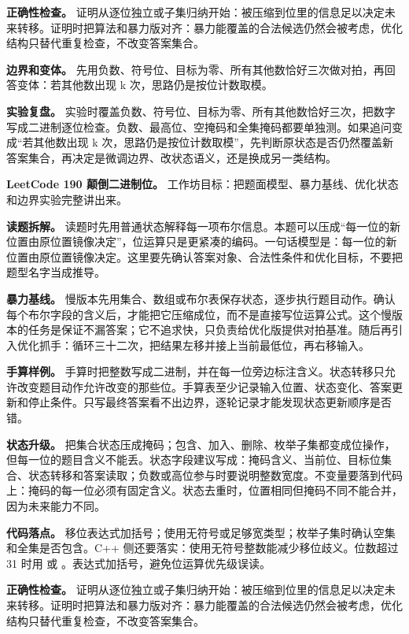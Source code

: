 \textbf{正确性检查。} 证明从逐位独立或子集归纳开始：被压缩到位里的信息足以决定未来转移。证明时把算法和暴力版对齐：暴力能覆盖的合法候选仍然会被考虑，优化结构只替代重复检查，不改变答案集合。

\textbf{边界和变体。} 先用负数、符号位、目标为零、所有其他数恰好三次做对拍，再回答变体：若其他数出现 k 次，思路仍是按位计数取模。

\textbf{实验复盘。} 实验时覆盖负数、符号位、目标为零、所有其他数恰好三次，把数字写成二进制逐位检查。负数、最高位、空掩码和全集掩码都要单独测。如果追问变成“若其他数出现 k 次，思路仍是按位计数取模”，先判断原状态是否仍然覆盖新答案集合，再决定是微调边界、改状态语义，还是换成另一类结构。

\noindent\textbf{LeetCode 190 颠倒二进制位。} 工作坊目标：把题面模型、暴力基线、优化状态和边界实验完整讲出来。

\textbf{读题拆解。} 读题时先用普通状态解释每一项布尔信息。本题可以压成“每一位的新位置由原位置镜像决定”，位运算只是更紧凑的编码。一句话模型是：每一位的新位置由原位置镜像决定。这里要先确认答案对象、合法性条件和优化目标，不要把题型名字当成推导。

\textbf{暴力基线。} 慢版本先用集合、数组或布尔表保存状态，逐步执行题目动作。确认每个布尔字段的含义后，才能把它压缩成位，而不是直接写位运算公式。这个慢版本的任务是保证不漏答案；它不追求快，只负责给优化版提供对拍基准。随后再引入优化抓手：循环三十二次，把结果左移并接上当前最低位，再右移输入。

\textbf{手算样例。} 手算时把整数写成二进制，并在每一位旁边标注含义。状态转移只允许改变题目动作允许改变的那些位。手算表至少记录输入位置、状态变化、答案更新和停止条件。只写最终答案看不出边界，逐轮记录才能发现状态更新顺序是否错。

\textbf{状态升级。} 把集合状态压成掩码；包含、加入、删除、枚举子集都变成位操作，但每一位的题目含义不能丢。状态字段建议写成：掩码含义、当前位、目标位集合、状态转移和答案读取；负数或高位参与时要说明整数宽度。不变量要落到代码上：掩码的每一位必须有固定含义。状态去重时，位置相同但掩码不同不能合并，因为未来能力不同。

\textbf{代码落点。} 移位表达式加括号；使用无符号或足够宽类型；枚举子集时确认空集和全集是否包含。C++ 侧还要落实：使用无符号整数能减少移位歧义。位数超过 31 时用  或 。表达式加括号，避免位运算优先级误读。

\textbf{正确性检查。} 证明从逐位独立或子集归纳开始：被压缩到位里的信息足以决定未来转移。证明时把算法和暴力版对齐：暴力能覆盖的合法候选仍然会被考虑，优化结构只替代重复检查，不改变答案集合。

